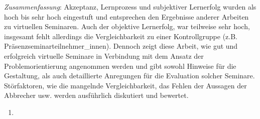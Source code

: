 \emph{Zusammenfassung}: Akzeptanz, Lernprozess und subjektiver
Lernerfolg wurden als hoch bis sehr hoch eingestuft und entsprechen den
Ergebnisse anderer Arbeiten zu virtuellen Seminaren. Auch der objektive
Lernerfolg, war teilweise sehr hoch, insgesamt fehlt allerdings die
Vergleichbarkeit zu einer Kontrollgruppe (z.B.
Präsenzseminarteilnehmer\_innen). Dennoch zeigt diese Arbeit, wie gut
und erfolgreich virtuelle Seminare in Verbindung mit dem Ansatz der
Problemorientierung angenommen werden und gibt sowohl Hinweise für die
Gestaltung, als auch detaillierte Anregungen für die Evaluation solcher
Seminare. Störfaktoren, wie die mangelnde Vergleichbarkeit, das Fehlen
der Aussagen der Abbrecher usw. werden ausführlich diskutiert und
bewertet.

\begin{enumerate}
\def\labelenumi{\arabic{enumi}.}
\setcounter{enumi}{3}
\itemsep1pt\parskip0pt
\item
  \textbf{}
\end{enumerate}

